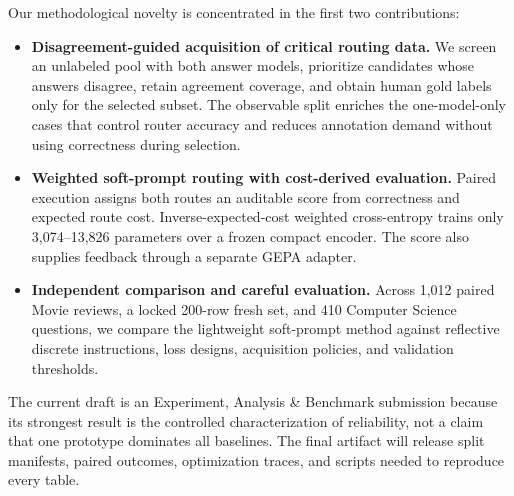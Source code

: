 Our methodological novelty is concentrated in the first two contributions:

\begin{itemize}[leftmargin=*]
  \item \textbf{Disagreement-guided acquisition of critical routing data.}
  We screen an unlabeled pool with both answer models, prioritize candidates
  whose answers disagree, retain agreement coverage, and obtain human gold
  labels only for the selected subset. The observable split enriches the
  one-model-only cases that control router accuracy and reduces annotation
  demand without using correctness during selection.
  \item \textbf{Weighted soft-prompt routing with cost-derived evaluation.}
  Paired execution assigns both routes an auditable score from correctness and
  expected route cost. Inverse-expected-cost weighted cross-entropy trains only
  3,074--13,826 parameters over a frozen compact encoder. The score also
  supplies feedback through a separate GEPA adapter.

  \item \textbf{Independent comparison and careful evaluation.} Across 1,012 paired Movie reviews, a locked 200-row fresh set,
  and 410 Computer Science questions, we compare the lightweight soft-prompt
  method against reflective discrete instructions, loss designs, acquisition
  policies, and validation thresholds.
\end{itemize}

The current draft is an Experiment, Analysis \& Benchmark submission because
its strongest result is the controlled characterization of reliability, not a
claim that one prototype dominates all baselines. The final artifact will
release split manifests, paired outcomes, optimization traces, and scripts
needed to reproduce every table.
